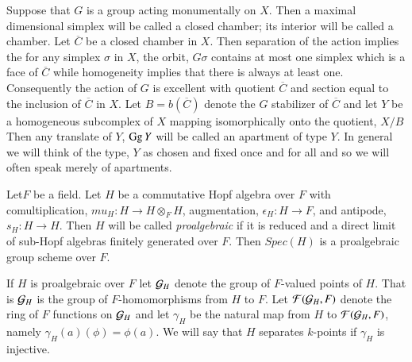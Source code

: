 Suppose that $G$ is a group acting monumentally on $X$. Then a maximal dimensional simplex will be called a closed chamber; its interior will be called a chamber. Let $\overline{C}$ be a closed chamber in $X$. Then separation of the action implies the for any simplex $\sigma$ in $X$, the orbit, $G\sigma$ contains at most one simplex which is a face of $\overline{C}$ while homogeneity implies that there is always at least one. Consequently the action of $G$ is excellent with quotient $\overline{C}$ and section equal to the inclusion of $\overline{C}$ in $X$. Let $B = b(\overline{C})$ denote the $G$ stabilizer of $\overline{C}$ and let $Y$ be a homogeneous subcomplex of $X$ mapping isomorphically onto the quotient, $X/B$ Then any translate of $Y$, $\operatorname{Gg} Y$ will be called an apartment of type $Y$. In general we will think of the type, $Y$ as chosen and fixed once and for all and so we will often speak merely of apartments.  

Let\pageoriginale $F$ be a field. Let $H$ be a commutative Hopf algebra over $F$ with comultiplication, $mu_{H} : H \rightarrow H \otimes_{F} H$, augmentation, $\epsilon_{H} : H \rightarrow F$, and antipode, $s_{H} : H \rightarrow H$. Then $H$ will be called \textit{proalgebraic} if it is reduced and a direct limit of sub-Hopf algebras finitely generated over $F$. Then $Spec(H)$ is a proalgebraic group scheme over $F$.

If $H$ is proalgebraic over $F$ let $\mathcal{G}_{H}$ denote the group of $F$-valued points of $H$. That is $\mathcal{G}_{H}$ is the group of $F$-homomorphisms from $H$ to $F$. Let $\mathcal{F}(\mathcal{G}_{H}, F)$ denote the ring of $F$ functions on $\mathcal{G}_{H}$ and let $\gamma_{H}$ be the natural map from $H$ to $\mathcal{F}(\mathcal{G}_{H}, F)$, namely $\gamma_{H}(a)(\phi) = \phi(a)$. We will say that $H$ separates $k$-points if $\gamma_{H}$ is injective.

